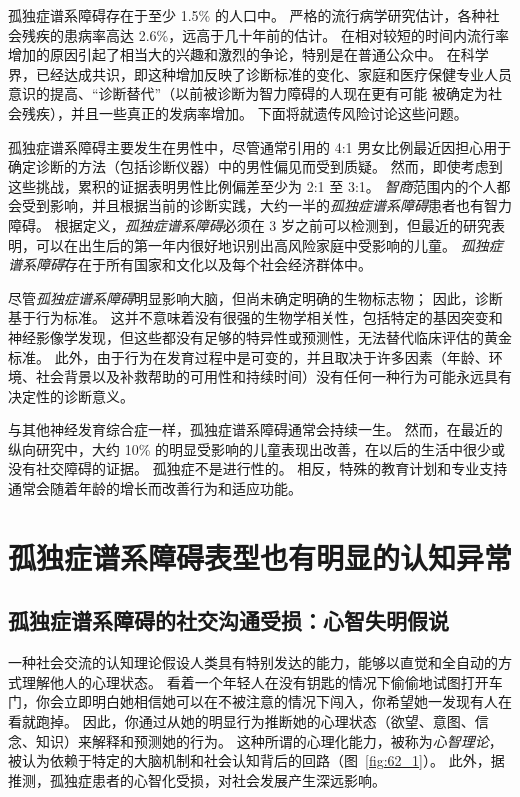 孤独症谱系障碍存在于至少 1.5\% 的人口中。
严格的流行病学研究估计，各种社会残疾的患病率高达 2.6\%，远高于几十年前的估计。
在相对较短的时间内流行率增加的原因引起了相当大的兴趣和激烈的争论，特别是在普通公众中。
在科学界，已经达成共识，即这种增加反映了诊断标准的变化、家庭和医疗保健专业人员意识的提高、“诊断替代”（以前被诊断为智力障碍的人现在更有可能 被确定为社会残疾），并且一些真正的发病率增加。
下面将就遗传风险讨论这些问题。


孤独症谱系障碍主要发生在男性中，尽管通常引用的 4:1 男女比例最近因担心用于确定诊断的方法（包括诊断仪器）中的男性偏见而受到质疑。
然而，即使考虑到这些挑战，累积的证据表明男性比例偏差至少为 2:1 至 3:1。
\textit{智商}范围内的个人都会受到影响，并且根据当前的诊断实践，大约一半的\textit{孤独症谱系障碍}患者也有智力障碍。
根据定义，\textit{孤独症谱系障碍}必须在 3 岁之前可以检测到，但最近的研究表明，可以在出生后的第一年内很好地识别出高风险家庭中受影响的儿童。
\textit{孤独症谱系障碍}存在于所有国家和文化以及每个社会经济群体中。


尽管\textit{孤独症谱系障碍}明显影响大脑，但尚未确定明确的生物标志物；
因此，诊断基于行为标准。
这并不意味着没有很强的生物学相关性，包括特定的基因突变和神经影像学发现，但这些都没有足够的特异性或预测性，无法替代临床评估的黄金标准。
此外，由于行为在发育过程中是可变的，并且取决于许多因素（年龄、环境、社会背景以及补救帮助的可用性和持续时间）没有任何一种行为可能永远具有决定性的诊断意义。


与其他神经发育综合症一样，孤独症谱系障碍通常会持续一生。
然而，在最近的纵向研究中，大约 10\% 的明显受影响的儿童表现出改善，在以后的生活中很少或没有社交障碍的证据。
孤独症不是进行性的。
相反，特殊的教育计划和专业支持通常会随着年龄的增长而改善行为和适应功能。



\section{孤独症谱系障碍表型也有明显的认知异常}

\subsection{孤独症谱系障碍的社交沟通受损：心智失明假说}

一种社会交流的认知理论假设人类具有特别发达的能力，能够以直觉和全自动的方式理解他人的心理状态。
看着一个年轻人在没有钥匙的情况下偷偷地试图打开车门，你会立即明白她相信她可以在不被注意的情况下闯入，你希望她一发现有人在看就跑掉。
因此，你通过从她的明显行为推断她的心理状态（欲望、意图、信念、知识）来解释和预测她的行为。
这种所谓的心理化能力，被称为\textit{心智理论}，被认为依赖于特定的大脑机制和社会认知背后的回路（图~\ref{fig:62_1}）。
此外，据推测，孤独症患者的心智化受损，对社会发展产生深远影响。


